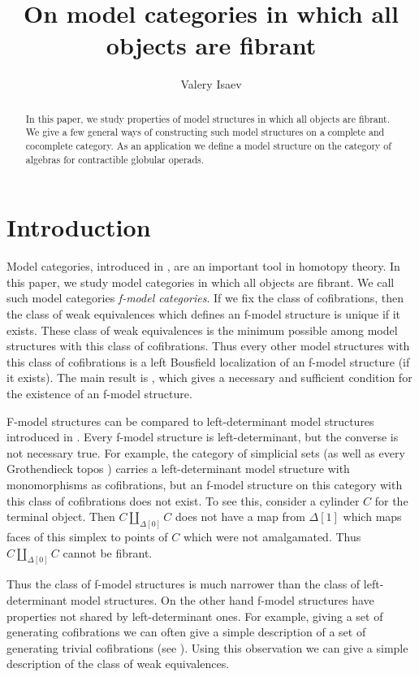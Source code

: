 \documentclass{amsart}
\author{Valery Isaev}
\title{On model categories in which all objects are fibrant}
\theoremstyle{definition}
\begin{document}
\begin{abstract}
In this paper, we study properties of model structures in which all objects are fibrant.
We give a few general ways of constructing such model structures on a complete and cocomplete category.
As an application we define a model structure on the category of algebras for contractible globular operads.
\end{abstract}

\maketitle

 \makeatletter
    \providecommand\@dotsep{5}
  \makeatother
  \listoftodos\relax

\section{Introduction}

Model categories, introduced in \cite{quillen}, are an important tool in homotopy theory.
In this paper, we study model categories in which all objects are fibrant.
We call such model categories \emph{f-model categories}.
If we fix the class of cofibrations, then the class of weak equivalences which defines an f-model structure is unique if it exists.
These class of weak equivalences is the minimum possible among model structures with this class of cofibrations.
Thus every other model structures with this class of cofibrations is a left Bousfield localization of an f-model structure (if it exists).
The main result is , which gives a necessary and sufficient condition for the existence of an f-model structure.

F-model structures can be compared to left-determinant model structures introduced in \cite{left-det}.
Every f-model structure is left-determinant, but the converse is not necessary true.
For example, the category of simplicial sets (as well as every Grothendieck topos \cite{cisinski})
carries a left-determinant model structure with monomorphisms as cofibrations,
but an f-model structure on this category with this class of cofibrations does not exist.
To see this, consider a cylinder $C$ for the terminal object.
Then $C \amalg_{\Delta[0]} C$ does not have a map from $\Delta[1]$ which
maps faces of this simplex to points of $C$ which were not amalgamated.
Thus $C \amalg_{\Delta[0]} C$ cannot be fibrant.

Thus the class of f-model structures is much narrower than the class of left-determinant model structures.
On the other hand f-model structures have properties not shared by left-determinant ones.
For example, giving a set of generating cofibrations we can often give
a simple description of a set of generating trivial cofibrations (see ).
Using this observation we can give a simple description of the class of weak equivalences.
\end{document}
